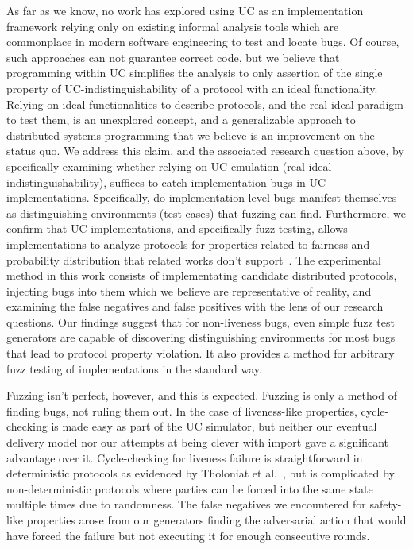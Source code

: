 As far as we know, no work has explored using UC as an implementation framework
relying only on existing informal analysis tools which are commonplace in modern
software engineering to test and locate bugs.  Of course, such approaches can
not guarantee correct code, but we believe that programming within UC
simplifies the analysis to only assertion of the single property of
UC-indistinguishability of a protocol with an ideal functionality.  Relying on
ideal functionalities to describe protocols, and the real-ideal paradigm to
test them, is an unexplored concept, and a generalizable approach to
distributed systems programming that we believe is an improvement on the status
quo.  We address this claim, and the associated research question above, by
specifically examining whether relying on UC emulation (real-ideal
indistinguishability), suffices to catch implementation bugs in UC
implementations.  Specifically, do implementation-level bugs manifest
themselves as distinguishing environments (test cases) that fuzzing can find.
Furthermore, we confirm that UC implementations, and specifically fuzz testing,
allows implementations to analyze protocols for properties related to fairness
and probability distribution that related works don't support~\cite{some, of, the, standards}.  The
experimental method in this work consists of implementating candidate
distributed protocols, injecting bugs into them which we believe are
representative of reality, and examining the false negatives and false
positives with the lens of our research questions.  Our findings suggest that
for non-liveness bugs, even simple fuzz test generators are capable of
discovering distinguishing environments for most bugs that lead to protocol
property violation. It also provides a method for arbitrary fuzz testing of 
implementations in the standard way. 

Fuzzing isn't perfect, however, and this is expected. 
Fuzzing is only a method of finding bugs, not ruling them out.
In the case of liveness-like properties, cycle-checking is made easy as part of the UC simulator, but neither our eventual delivery model nor our attempts at being clever with import gave a significant advantage over it.
Cycle-checking for liveness failure is straightforward in deterministic protocols as evidenced by Tholoniat et al.~\cite{tholoniat2022formal}, but is complicated by non-deterministic protocols where parties can be forced into the same state multiple times due to randomness.
The false negatives we encountered for safety-like properties arose from our generators finding the adversarial action that would have forced the failure but not executing it for enough consecutive rounds. 

